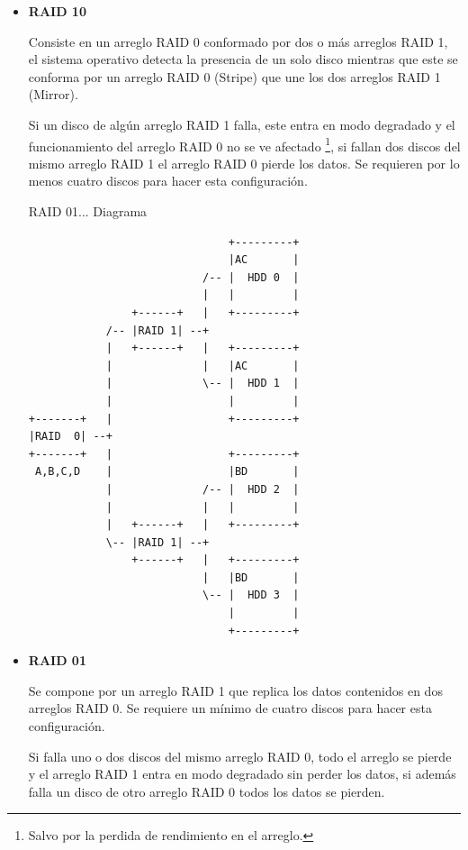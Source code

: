 \begin{itemize}

  \item \textbf{RAID 10}

Consiste en un arreglo RAID 0 conformado por dos o m\'{a}s arreglos RAID 1, el sistema operativo detecta la presencia de un solo disco mientras que este se conforma por un arreglo RAID 0 (Stripe) que une los dos arreglos RAID 1 (Mirror).

Si un disco de alg\'{u}n arreglo RAID 1 falla, este entra en modo degradado y el funcionamiento del arreglo RAID 0 no se ve afectado \footnote{Salvo por la perdida de rendimiento en el arreglo.}, si fallan dos discos del mismo arreglo RAID 1 el arreglo RAID 0 pierde los datos. Se requieren por lo menos cuatro discos para hacer esta configuraci\'{o}n.

RAID 01... Diagrama \cite{3638d46cd02c0cd72e333c6d6f8f9608}
{
\scriptsize
\linespread{1}
\begin{verbatim}
                               +---------+
                               |AC       |
                           /-- |  HDD 0  |
                           |   |         |
                +------+   |   +---------+
            /-- |RAID 1| --+
            |   +------+   |   +---------+
            |              |   |AC       |
            |              \-- |  HDD 1  |
            |                  |         |
+-------+   |                  +---------+
|RAID  0| --+
+-------+   |                  +---------+
 A,B,C,D    |                  |BD       |
            |              /-- |  HDD 2  |
            |              |   |         |
            |   +------+   |   +---------+
            \-- |RAID 1| --+
                +------+   |   +---------+
                           |   |BD       |
                           \-- |  HDD 3  |
                               |         |
                               +---------+
\end{verbatim}
}

  \item \textbf{RAID 01}

Se compone por un arreglo RAID 1 que replica los datos contenidos en dos arreglos RAID 0. Se requiere un m\'{i}nimo de cuatro discos para hacer esta configuraci\'{o}n.

Si falla uno o dos discos del mismo arreglo RAID 0, todo el arreglo se pierde y el arreglo RAID 1 entra en modo degradado sin perder los datos, si adem\'{a}s falla un disco de otro arreglo RAID 0 todos los datos se pierden.
  

\end{itemize}
